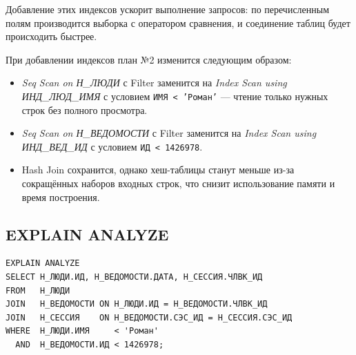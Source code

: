 \documentclass[12pt,a4paper]{article}
\begin{document}
Добавление этих индексов ускорит выполнение запросов: по перечисленным полям
производится выборка с оператором сравнения, и соединение таблиц будет
происходить быстрее.

При добавлении индексов план №2 изменится следующим образом:
\begin{itemize}
  \item \textit{Seq Scan on Н\_ЛЮДИ} с Filter заменится на
        \textit{Index Scan using ИНД\_ЛЮД\_ИМЯ} с условием
        \texttt{ИМЯ < 'Роман'} --- чтение только нужных строк без полного просмотра.
  \item \textit{Seq Scan on Н\_ВЕДОМОСТИ} с Filter заменится на
        \textit{Index Scan using ИНД\_ВЕД\_ИД} с условием \texttt{ИД < 1426978}.
  \item Hash Join сохранится, однако хеш-таблицы станут меньше из-за
        сокращённых наборов входных строк, что снизит использование памяти
        и время построения.
\end{itemize}

\subsection{EXPLAIN ANALYZE}

\begin{lstlisting}[style=planstyle]
EXPLAIN ANALYZE
SELECT Н_ЛЮДИ.ИД, Н_ВЕДОМОСТИ.ДАТА, Н_СЕССИЯ.ЧЛВК_ИД
FROM   Н_ЛЮДИ
JOIN   Н_ВЕДОМОСТИ ON Н_ЛЮДИ.ИД = Н_ВЕДОМОСТИ.ЧЛВК_ИД
JOIN   Н_СЕССИЯ    ON Н_ВЕДОМОСТИ.СЭС_ИД = Н_СЕССИЯ.СЭС_ИД
WHERE  Н_ЛЮДИ.ИМЯ     < 'Роман'
  AND  Н_ВЕДОМОСТИ.ИД < 1426978;
\end{lstlisting}
\end{document}
